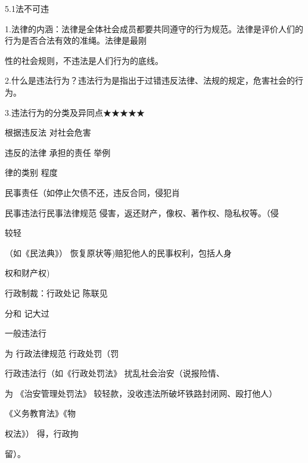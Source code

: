 \documentclass[lang=cn,11pt]{elegantbook}
\newcommand{\daofasym}[1]{{\daofasymbolfont #1}}
\newcommand{\daofasym}[1]{#1}
\begin{document}
5.1法不可违\par

1.法律的内涵：法律是全体社会成员都要共同遵守的行为规范。法律是评价人们的行为是否合法有效的准绳。法律是最刚\par

性的社会规则，不违法是人们行为的底线。\par

2.什么是违法行为？违法行为是指出于过错违反法律、法规的规定，危害社会的行为。\par

3.违法行为的分类及异同点\daofasym{★}\daofasym{★}\daofasym{★}\daofasym{★}\daofasym{★}\par

根据违反法 对社会危害\par

违反的法律 承担的责任 举例\par

律的类别 程度\par

民事责任（如停止欠债不还，违反合同，侵犯肖\par

民事违法行民事法律规范 侵害，返还财产，像权、著作权、隐私权等。（侵\par

较轻\par

（如《民法典》） 恢复原状等)赔犯他人的民事权利，包括人身\par

权和财产权)\par

行政制裁：行政处记 陈联见\par

分和 记大过\par

一般违法行\par

为 行政法律规范 行政处罚（罚\par

行政违法行（如《行政处罚法》 扰乱社会治安（说报险情、\par

为 《治安管理处罚法》 较轻款，没收违法所破坏铁路封闭网、殴打他人）\par

《义务教育法》《物\par

权法》） 得，行政拘\par

留）。\par
\end{document}

